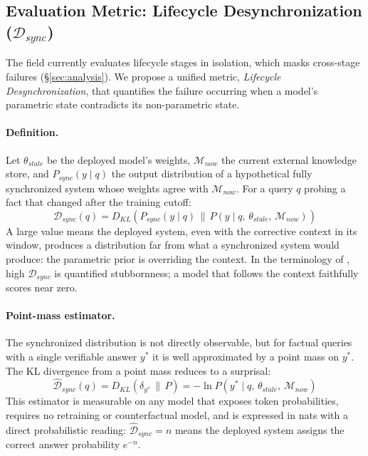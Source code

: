\documentclass{article}
\begin{document}
\subsection{Evaluation Metric: Lifecycle Desynchronization ($\mathcal{D}_{sync}$)}
\label{sec:dsync}

The field currently evaluates lifecycle stages in isolation, which masks cross-stage failures (\S\ref{sec:analysis}). We propose a unified metric, \textit{Lifecycle Desynchronization}, that quantifies the failure occurring when a model's parametric state contradicts its non-parametric state.

\paragraph{Definition.} Let $\theta_{stale}$ be the deployed model's weights, $\mathcal{M}_{now}$ the current external knowledge store, and $P_{sync}(y \mid q)$ the output distribution of a hypothetical fully synchronized system whose weights agree with $\mathcal{M}_{now}$. For a query $q$ probing a fact that changed after the training cutoff:
\begin{equation}
  \label{eq:dsync}
  \mathcal{D}_{sync}(q) = D_{KL}\!\left( P_{sync}(y \mid q) \,\Big\|\, P(y \mid q,\, \theta_{stale},\, \mathcal{M}_{now}) \right)
\end{equation}
A large value means the deployed system, even with the corrective context in its window, produces a distribution far from what a synchronized system would produce: the parametric prior is overriding the context. In the terminology of \citet{xie2024conflicts}, high $\mathcal{D}_{sync}$ is quantified stubbornness; a model that follows the context faithfully scores near zero.

\paragraph{Point-mass estimator.} The synchronized distribution is not directly observable, but for factual queries with a single verifiable answer $y^*$ it is well approximated by a point mass on $y^*$. The KL divergence from a point mass reduces to a surprisal:
\begin{equation}
  \label{eq:estimator}
  \widehat{\mathcal{D}}_{sync}(q) = D_{KL}\!\left( \delta_{y^*} \,\|\, P \right) = -\ln P\!\left(y^* \mid q,\, \theta_{stale},\, \mathcal{M}_{now}\right)
\end{equation}
This estimator is measurable on any model that exposes token probabilities, requires no retraining or counterfactual model, and is expressed in nats with a direct probabilistic reading: $\widehat{\mathcal{D}}_{sync} = n$ means the deployed system assigns the correct answer probability $e^{-n}$.
\end{document}
